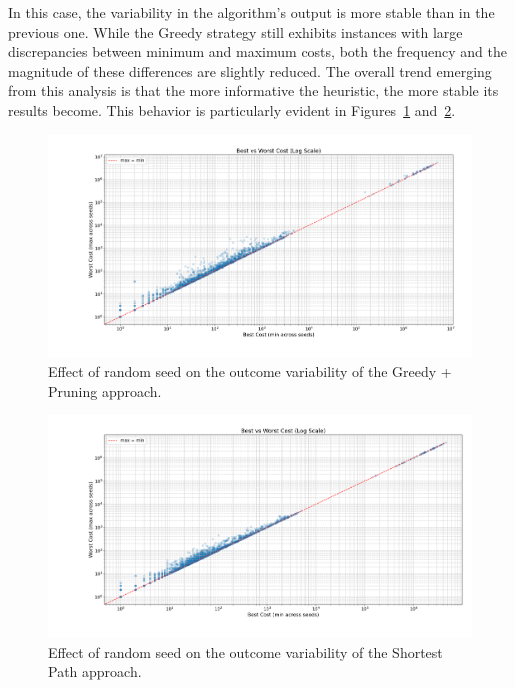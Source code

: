 In this case, the variability in the algorithm's output is more stable than in the previous one. While the Greedy strategy still
exhibits instances with large discrepancies between minimum and maximum costs, both the frequency and the magnitude of these
differences are slightly reduced.
The overall trend emerging from this analysis is that the more informative the heuristic, the more stable its results become.
This behavior is particularly evident in Figures~\ref{fig:rand_pruning} and~\ref{fig:rand_sp}.

\begin{figure}[ht]
	\centering
	\includegraphics[width=\textwidth]{images/randomization_pruning.png}
	\caption{Effect of random seed on the outcome variability of the Greedy + Pruning approach.}
	\label{fig:rand_pruning}
\end{figure}

\begin{figure}[ht]
	\centering
	\includegraphics[width=\textwidth]{images/randomization_sp.png}
	\caption{Effect of random seed on the outcome variability of the Shortest Path approach.}
	\label{fig:rand_sp}
\end{figure}

